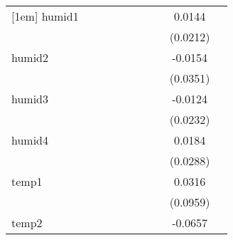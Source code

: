 {\begin{tabular}{l*{9}{c}}
[1em]
humid1      &                     &                     &                     &                     &                     &                     &                     &      0.0144         &                     \\
            &                     &                     &                     &                     &                     &                     &                     &    (0.0212)         &                     \\
[1em]
humid2      &                     &                     &                     &                     &                     &                     &                     &     -0.0154         &                     \\
            &                     &                     &                     &                     &                     &                     &                     &    (0.0351)         &                     \\
[1em]
humid3      &                     &                     &                     &                     &                     &                     &                     &     -0.0124         &                     \\
            &                     &                     &                     &                     &                     &                     &                     &    (0.0232)         &                     \\
[1em]
humid4      &                     &                     &                     &                     &                     &                     &                     &      0.0184         &                     \\
            &                     &                     &                     &                     &                     &                     &                     &    (0.0288)         &                     \\
[1em]
temp1       &                     &                     &                     &                     &                     &                     &                     &      0.0316         &                     \\
            &                     &                     &                     &                     &                     &                     &                     &    (0.0959)         &                     \\
[1em]
temp2       &                     &                     &                     &                     &                     &                     &                     &     -0.0657         &                     \\

\end{tabular}}
